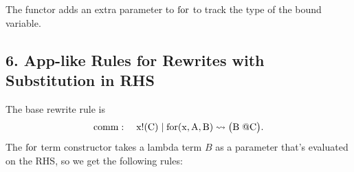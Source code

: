 \documentclass{article}
\begin{document}
\begin{prooftree}
\end{prooftree}

The functor adds an extra parameter to $\rm{for}$ to track the type of the bound variable.
\begin{prooftree}
\end{prooftree}

\begin{prooftree}
\end{prooftree}

\begin{prooftree}
\end{prooftree}

\begin{prooftree}
\end{prooftree}

\begin{prooftree}
\end{prooftree}

\begin{prooftree}
\end{prooftree}

\subsection*{6. App-like Rules for Rewrites with Substitution in RHS}

The base rewrite rule is
\[
\rm{comm}:\quad x!(C) \mid \rm{for}(x, A, B) \leadsto \bigl(B\; @C\bigr).
\]
The $\rm{for}$ term constructor takes a lambda term $B$ as a parameter that's evaluated on the RHS, so we get the following rules:
\end{document}
